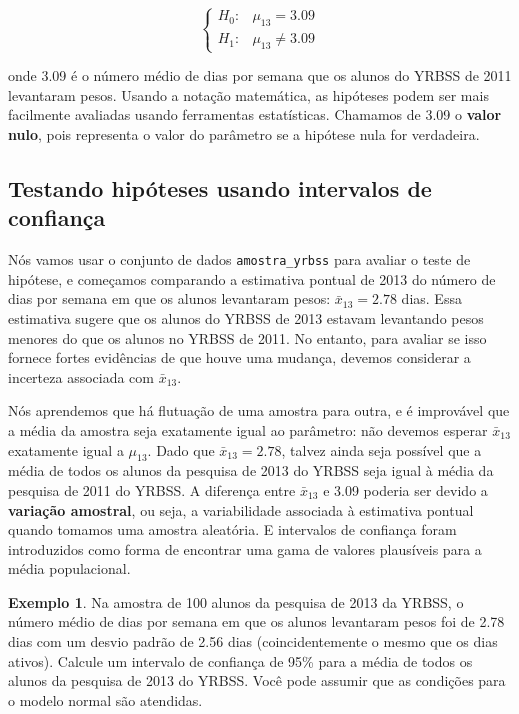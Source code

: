 \documentclass[
]{book}
\theoremstyle{definition}
\theoremstyle{definition}
\newtheorem{example}{Exemplo}[chapter]
\theoremstyle{definition}
\theoremstyle{definition}
\theoremstyle{remark}
\begin{document}
\[
\begin{cases}
H_0: & \mu_{13} = 3.09 \\
H_1: & \mu_{13} \neq 3.09
\end{cases}
\]

onde 3.09 é o número médio de dias por semana que os alunos do YRBSS de 2011 levantaram pesos. Usando a notação matemática, as hipóteses podem ser mais facilmente avaliadas usando ferramentas estatísticas. Chamamos de 3.09 o \textbf{valor nulo}, pois representa o valor do parâmetro se a hipótese nula for verdadeira.

\hypertarget{testHypothesisConfidenceIntervals}{%
\subsection{Testando hipóteses usando intervalos de confiança}\label{testHypothesisConfidenceIntervals}}

Nós vamos usar o conjunto de dados \texttt{amostra\_yrbss} para avaliar o teste de hipótese, e começamos comparando a estimativa pontual de 2013 do número de dias por semana em que os alunos levantaram pesos: \(\bar{x}_{13} = 2.78\) dias. Essa estimativa sugere que os alunos do YRBSS de 2013 estavam levantando pesos menores do que os alunos no YRBSS de 2011. No entanto, para avaliar se isso fornece fortes evidências de que houve uma mudança, devemos considerar a incerteza associada com \(\bar{x}_{13}\).

Nós aprendemos que há flutuação de uma amostra para outra, e é improvável que a média da amostra seja exatamente igual ao parâmetro: não devemos esperar \(\bar{x}_{13}\) exatamente igual a \(\mu_{13}\). Dado que \(\bar{x}_{13} = 2.78\), talvez ainda seja possível que a média de todos os alunos da pesquisa de 2013 do YRBSS seja igual à média da pesquisa de 2011 do YRBSS. A diferença entre \(\bar{x}_{13}\) e 3.09 poderia ser devido a \textbf{variação amostral}, ou seja, a variabilidade associada à estimativa pontual quando tomamos uma amostra aleatória. E intervalos de confiança foram introduzidos como forma de encontrar uma gama de valores plausíveis para a média populacional.

\begin{example}
\protect\hypertarget{exm:unnamed-chunk-160}{}{\label{exm:unnamed-chunk-160} }Na amostra de 100 alunos da pesquisa de 2013 da YRBSS, o número médio de dias por semana em que os alunos levantaram pesos foi de 2.78 dias com um desvio padrão de 2.56 dias (coincidentemente o mesmo que os dias ativos). Calcule um intervalo de confiança de 95\% para a média de todos os alunos da pesquisa de 2013 do YRBSS. Você pode assumir que as condições para o modelo normal são atendidas.
\end{example}
\end{document}
